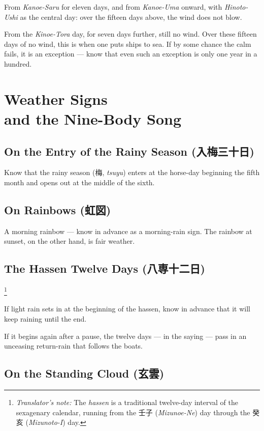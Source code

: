 \documentclass[10pt, openany]{book}
\newcommand{\jp}[1]{{\japanesefont #1}}
\newcommand{\tn}[1]{\footnote{\textit{Translator's note:} #1}}
\newcommand{\jt}[2]{\jp{#1} (\textit{#2})}
\begin{document}
From \textit{Kanoe-Saru} for eleven days, and from
\textit{Kanoe-Uma} onward, with \textit{Hinoto-Ushi} as the central
day: over the fifteen days above, the wind does not blow.

From the \textit{Kinoe-Tora} day, for seven days further, still no
wind. Over these fifteen days of no wind, this is when one puts
ships to sea. If by some chance the calm fails, it is an exception
--- know that even such an exception is only one year in a hundred.

\chapter{Weather Signs\\ and the Nine-Body Song}

\section{On the Entry of the Rainy Season (\jp{入梅三十日})}

Know that the rainy season (\jp{梅}, \textit{tsuyu}) enters at the
horse-day beginning the fifth month and opens out at the middle of
the sixth.

\section{On Rainbows (\jp{虹図})}

A morning rainbow --- know in advance as a morning-rain sign. The
rainbow at sunset, on the other hand, is fair weather.

\section{The Hassen Twelve Days (\jp{八専十二日})}\tn{The
\textit{hassen} is a traditional twelve-day interval of the
sexagenary calendar, running from the \jt{壬子}{Mizunoe-Ne} day
through the \jt{癸亥}{Mizunoto-I} day.}

If light rain sets in at the beginning of the hassen, know in
advance that it will keep raining until the end.

If it begins again after a pause, the twelve days --- in the
saying --- pass in an unceasing return-rain that follows the boats.

\section{On the Standing Cloud (\jp{玄雲})}
\end{document}
